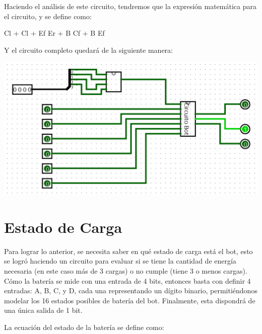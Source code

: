 \documentclass[a4paper]{article}
\begin{document}

Haciendo el análisis de este circuito, tendremos que la expresión matemática para el circuito, y se define como:

\begin{center}
    
     Cl  +  Cl  +  Ef Er  + B  Cf + B  Ef 
    \label{eq:ej_ecuacion} %

\end{center}

Y el circuito completo quedará de la siguiente manera:


\begin{center}
    \includegraphics[width=1\textwidth]{tarea-1-main.png} %
\end{center}

\section{Estado de Carga}
Para lograr lo anterior, se necesita saber en qué estado de carga está el bot, esto se logró haciendo un circuito para evaluar si se tiene la cantidad de energía necesaria (en este caso más de 3 cargas) o no cumple (tiene 3 o menos cargas). Cómo la batería se mide con una entrada de 4 bits, entonces basta con definir 4 entradas: A, B, C, y D, cada una representando un dígito binario, permitiéndonos modelar los 16 estados posibles de batería del bot. Finalmente, esta dispondrá de una única salida de 1 bit.

La ecuación del estado de la batería se define como:
\end{document}

